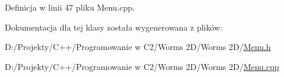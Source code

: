 Definicja w linii 47 pliku Menu.\+cpp.



Dokumentacja dla tej klasy została wygenerowana z plików\+:\begin{DoxyCompactItemize}
\item 
D\+:/\+Projekty/\+C++/\+Programowanie w C2/\+Worms 2\+D/\+Worms 2\+D/\mbox{\hyperlink{_menu_8h}{Menu.\+h}}\item 
D\+:/\+Projekty/\+C++/\+Programowanie w C2/\+Worms 2\+D/\+Worms 2\+D/\mbox{\hyperlink{_menu_8cpp}{Menu.\+cpp}}\end{DoxyCompactItemize}
